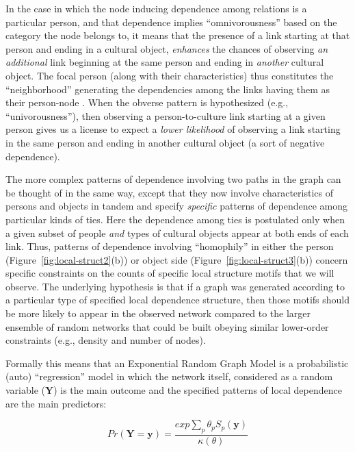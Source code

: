 \documentclass[preprint,12pt,authoryear]{elsarticle}
\begin{document}
In the case in which the node inducing dependence among relations is a particular person, and that dependence implies ``omnivorousness'' based on the category the node belongs to, it means that the presence of a link starting at that person and ending in a cultural object, \textit{enhances} the chances of observing \textit{an additional} link beginning at the same person and ending in \textit{another} cultural object. The focal person (along with their characteristics) thus constitutes the ``neighborhood'' generating the dependencies among the links having them as their person-node \citep{pattison2002neighborhood}. When the obverse pattern is hypothesized (e.g., ``univorousness''), then observing a person-to-culture link starting at a given person gives us a license to expect a \textit{lower likelihood} of observing a link starting in the same person and ending in another cultural object (a sort of negative dependence). 

The more complex patterns of dependence involving two paths in the graph can be thought of in the same way, except that they now involve characteristics of persons and objects in tandem and specify \textit{specific} patterns of dependence among particular kinds of ties. Here the dependence among ties is postulated only when a given subset of people \textit{and} types of cultural objects appear at both ends of each link. Thus, patterns of dependence involving ``homophily'' in either the person (Figure~\ref{fig:local-struct2}(b)) or object side (Figure~\ref{fig:local-struct3}(b)) concern specific constraints on the counts of specific local structure motifs that we will observe. The underlying hypothesis is that if a graph was generated according to a particular type of specified local dependence structure, then those motifs should be more likely to appear in the observed network compared to the larger ensemble of random networks that could be built obeying similar lower-order constraints (e.g., density and number of nodes). 

Formally this means that an Exponential Random Graph Model is a probabilistic (auto) ``regression'' model in which the network itself, considered as a random variable ($\mathbf{Y}$) is the main outcome and the specified patterns of local dependence are the main predictors:

\begin{equation}
    Pr(\mathbf{Y} = \mathbf{y}) = \frac{exp\sum_p \theta_p S_p(\mathbf{y})}{\kappa(\theta)}
\end{equation}
\end{document}
